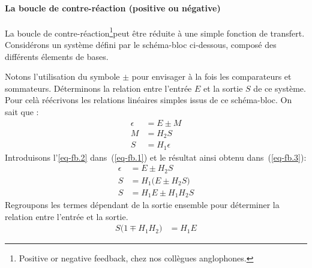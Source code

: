 \paragraph{La boucle de contre-réaction (positive ou négative)
          \label{sec-boucle}}
La boucle de contre-réaction\footnote{\og Positive or negative feedback\fg, 
chez nos collègues anglophones.}peut être réduite à une simple fonction 
de transfert. Considérons un système défini par le schéma-bloc ci-dessous, 
composé des différents élements de bases.
\begin{center}
    
\end{center}
Notons l'utilisation du symbole $\pm$ pour envisager à la fois les 
comparateurs et sommateurs.
Déterminons la relation entre l'entrée $E$ et la sortie $S$ de ce système.
Pour celà réécrivons les relations linéaires simples issus de ce schéma-bloc.
On sait que :
\begin{align}
    \epsilon&=E\pm M \label{eq-fb.1}\\
    M&=H_2S       \label{eq-fb.2}\\
    S&=H_1\epsilon \label{eq-fb.3}
\end{align}
Introduisons l'\cref{eq-fb.2} dans~(\ref{eq-fb.1}) et le résultat ainsi 
obtenu dans~(\ref{eq-fb.3}):
\begin{align*}
    \epsilon&=E\pm H_2S \\
     S&=H_1\big(E\pm H_2S\big) \\
     S&=H_1E\pm H_1H_2S
\end{align*}
Regroupons les termes dépendant de la sortie ensemble pour déterminer 
la relation entre l'entrée et la sortie.
\begin{align*}
    S\big(1\mp H_1H_2\big)&=H_1E 
\end{align*}
